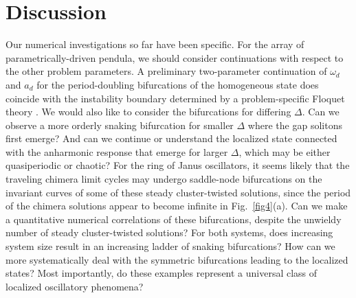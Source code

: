 \documentclass[aps,pre,amsmath,amssymb,floatfix,onecolumn,notitlepage,10pt]{revtex4-1}
\begin{document}
\section{Discussion}
Our numerical investigations so far have been specific. For the array of parametrically-driven pendula, we should consider continuations with respect to the other problem parameters. A preliminary two-parameter continuation of $\omega_d$ and $a_d$ for the period-doubling bifurcations of the homogeneous state does coincide with the instability boundary determined by a problem-specific Floquet theory \cite{2021_Nicolaou_1,2021_Nicolaou_2}. We would also like to consider the bifurcations for differing $\Delta$. Can we observe a more orderly snaking bifurcation for smaller $\Delta$ where the gap solitons first emerge? And can we continue or understand the localized state connected with the anharmonic response that emerge for larger $\Delta$, which may be either quasiperiodic or chaotic? For the ring of Janus oscillators, it seems likely that the traveling chimera limit cycles may undergo saddle-node bifurcations on the invariant curves of some of these steady cluster-twisted solutions, since the period of the chimera solutions appear to become infinite in Fig.~\ref{fig4}(a).  Can we make a quantitative numerical correlations of these bifurcations, despite the unwieldy number of steady cluster-twisted solutions?  For both systems, does increasing system size result in an increasing ladder of snaking bifurcations? How can we more systematically deal with the symmetric bifurcations leading to the localized states? Most importantly, do these examples represent a universal class of localized oscillatory phenomena?
\end{document}
